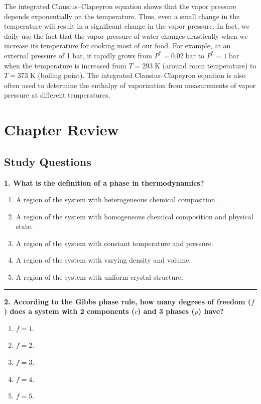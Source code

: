 \documentclass[
  9pt,
]{extbook}
\providecommand{\tightlist}{%
  \setlength{\itemsep}{0pt}\setlength{\parskip}{0pt}}
\theoremstyle{definition}
\theoremstyle{definition}
\theoremstyle{definition}
\theoremstyle{definition}
\theoremstyle{remark}
\begin{document}
The integrated Clausius--Clapeyron equation shows that the vapor pressure depends exponentially on the temperature. Thus, even a small change in the temperature will result in a significant change in the vapor pressure. In fact, we daily use the fact that the vapor pressure of water changes drastically when we increase its temperature for cooking most of our food. For example, at an external pressure of 1 bar, it rapidly grows from \(P^*=0.02\;\text{bar}\) to \(P^*=1\;\text{bar}\) when the temperature is increased from \(T=293\;\mathrm{K}\) (around room temperature) to \(T=373\;\mathrm{K}\) (boiling point). The integrated Clausius--Clapeyron equation is also often used to determine the enthalpy of vaporization from measurements of vapor pressure at different temperatures.

\section{Chapter Review}\label{rev12}

\subsection{Study Questions}\label{quest12}

\textbf{1. What is the definition of a phase in thermodynamics?}

\begin{enumerate}
\def\labelenumi{\alph{enumi}.}
\tightlist
\item
  A region of the system with heterogeneous chemical composition.
\item
  A region of the system with homogeneous chemical composition and physical state.
\item
  A region of the system with constant temperature and pressure.
\item
  A region of the system with varying density and volume.
\item
  A region of the system with uniform crystal structure.
\end{enumerate}

\begin{center}\rule{0.5\linewidth}{0.5pt}\end{center}

\textbf{2. According to the Gibbs phase rule, how many degrees of freedom (\(f\)) does a system with 2 components (\(c\)) and 3 phases (\(p\)) have?}

\begin{enumerate}
\def\labelenumi{\alph{enumi}.}
\tightlist
\item
  \(f = 1\).
\item
  \(f = 2\).
\item
  \(f = 3\).
\item
  \(f = 4\).
\item
  \(f = 5\).
\end{enumerate}
\end{document}
